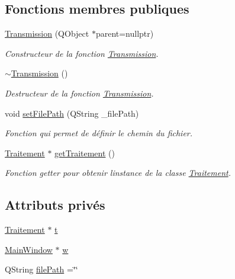 \subsection*{Fonctions membres publiques}
\begin{DoxyCompactItemize}
\item 
\hyperlink{classTransmission_a1d8087d2d09b9ddd4fd6e8261daed9f3}{Transmission} (Q\+Object $\ast$parent=nullptr)
\begin{DoxyCompactList}\small\item\em Constructeur de la fonction \hyperlink{classTransmission}{Transmission}. \end{DoxyCompactList}\item 
\hyperlink{classTransmission_adcdc6012d99ddb1d0c3159d50984e146}{$\sim$\+Transmission} ()
\begin{DoxyCompactList}\small\item\em Destructeur de la fonction \hyperlink{classTransmission}{Transmission}. \end{DoxyCompactList}\item 
void \hyperlink{classTransmission_a5099a8d2ae60a2f159230bf81bafebdc}{set\+File\+Path} (Q\+String \+\_\+file\+Path)
\begin{DoxyCompactList}\small\item\em Fonction qui permet de définir le chemin du fichier. \end{DoxyCompactList}\item 
\hyperlink{classTraitement}{Traitement} $\ast$ \hyperlink{classTransmission_ae7c158b2d20256c381d7e0bb8552f154}{get\+Traitement} ()
\begin{DoxyCompactList}\small\item\em Fonction getter pour obtenir l\textquotesingle{}instance de la classe \hyperlink{classTraitement}{Traitement}. \end{DoxyCompactList}\end{DoxyCompactItemize}
\subsection*{Attributs privés}
\begin{DoxyCompactItemize}
\item 
\hyperlink{classTraitement}{Traitement} $\ast$ \hyperlink{classTransmission_ad05ceda47dcb0763e32e03e089defdb0}{t}
\item 
\hyperlink{classMainWindow}{Main\+Window} $\ast$ \hyperlink{classTransmission_a46ff40b83d046581408dce2027139fe0}{w}
\item 
Q\+String \hyperlink{classTransmission_a3514cc6116b900b586f8cbf194cb39e7}{file\+Path} =\char`\"{}\char`\"{}
\end{DoxyCompactItemize}


